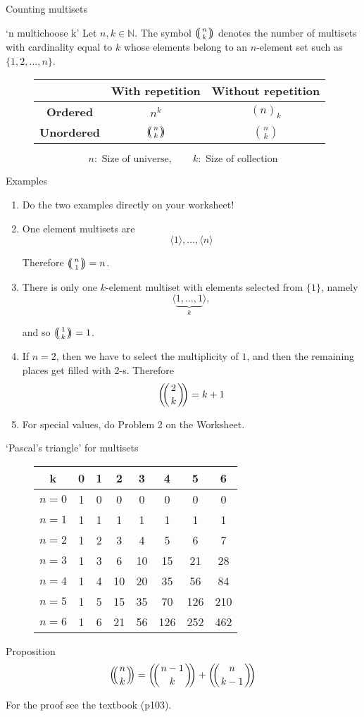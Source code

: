 \documentclass{beamer}
\def\multiset#1#2{\ensuremath{\left(\kern-.3em\left(\genfrac{}{}{0pt}{}{#1}{#2}\right)\kern-.3em\right)}}
\def\bl[#1]#2{\begin{block}{#1}#2\end{block}}
\def\enumb{\begin{enumerate}}
\def\enume{\end{enumerate}}
\begin{document}
\begin{frame}{Counting multisets}
\bl[`n multichoose k']{
Let $n,k\in\mathbb{N}$. The symbol $\multiset{n}{k}$ denotes the number of multisets with cardinality equal to $k$ whose elements belong to an $n$-element set such as $\{1,2,\dots,n\}$.
}

\begin{figure}
\centering
\begin{tabular}{|c|c|c|}
\hline
&With repetition&Without repetition\\
\hline
\textbf{Ordered}&$n^k$&$(n)_k$\\
\hline
\textbf{Unordered}&$\multiset{n}{k}$&$\binom{n}{k}$\\
\hline
\end{tabular}
\end{figure}
\[
n:\textrm{ Size of universe},\qquad k: \textrm{ Size of collection}
\]
\end{frame}

\begin{frame}{Examples}
\enumb
\item Do the two examples directly on your worksheet!
\item One element multisets are
\[
\langle 1\rangle,\dots,\langle n\rangle
\]\vspace{-0.7cm}

Therefore $\multiset{n}{1}=n$.
\item There is only one $k$-element multiset with elements selected from $\{1\}$, namely
\[
\langle\underbrace{1,\dots,1}_{k}\rangle,
\]\vspace{-0.8cm}

and so $\multiset{1}{k}=1$.
\item If $n=2$, then we have to select the multiplicity of $1$, and then the remaining places get filled with $2$-s. Therefore
\[
\multiset{2}{k}=k+1
\]
\item For special values, do Problem 2 on the Worksheet.
\enume

\end{frame}

\begin{frame}{`Pascal's triangle' for multisets}
\begin{figure}
\centering
\begin{tabular}{|c|ccccccc|}
\hline
k&0&1&2&3&4&5&6\\
\hline
$n=0$&1&0&0&0&0&0&0\\
$n=1$&1&1&1&1&1&1&1\\
$n=2$&1&2&3&4&5&6&7\\
$n=3$&1&3&6&10&15&21&28\\
$n=4$&1&4&10&20&35&56&84\\
$n=5$&1&5&15&35&70&126&210\\
$n=6$&1&6&21&56&126&252&462\\
\hline
\end{tabular}
\end{figure}

\bl[Proposition]{
\[
\multiset{n}{k}=\multiset{n-1}{k}+\multiset{n}{k-1}
\]
}

For the proof see the textbook (p103).
\end{frame}
\end{document}
